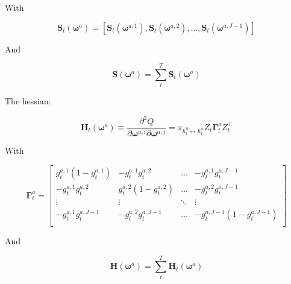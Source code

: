 \documentclass[12pt]{article}
\newcommand{\gateprod}[2]{\pi_{#1 \longleftrightarrow #2}}
\begin{document}
With

\begin{equation}
  \boldsymbol{S}_{t}(\boldsymbol{\omega}^{a}) = \left[\boldsymbol{S}_{t}(\boldsymbol{\omega}^{a, 1}),
                                                      \boldsymbol{S}_{t}(\boldsymbol{\omega}^{a, 2}),
                                                      \hdots, 
                                                      \boldsymbol{S}_{t}(\boldsymbol{\omega}^{a, J - 1})\right]
\end{equation}

And

\begin{equation}
  \boldsymbol{S}(\boldsymbol{\omega}^{a}) = \sum_{t}^{T} \boldsymbol{S}_{t}(\boldsymbol{\omega}^{a})
\end{equation}

\bigskip




The hessian:
\newcommand{\bw}[1]{\boldsymbol{\omega}^{#1}}
\newcommand{\Ht}[1]{\mathbf{H}_{t}(#1)}
\newcommand{\HH}[1]{\boldsymbol{H}(#1)}
\newcommand{\HI}[1]{\boldsymbol{H}^{-1}(#1)}

\begin{equation} \label{eq:nodehessian}
  \Ht{\bw{a}} \equiv \frac{\partial^{2} Q}{\partial \boldsymbol{\omega}^{a,i} \partial \boldsymbol{\omega}^{a,j}} = \gateprod{h^{0}_{t}}{h^{a}_{t}} Z_{t} \boldsymbol{\Gamma}^{a}_{t}  Z_{t}^\top
\end{equation}

With

\begin{equation}
  \boldsymbol{\Gamma}^{a}_{t} = \begin{bmatrix}
  g_{t}^{a,1}(1-g_{t}^{a,1}) & -g_{t}^{a,1}g_{t}^{a,2}    & \dots  & -g_{t}^{a,1}g_{t}^{a,J-1}       \\
  -g_{t}^{a,1}g_{t}^{a,2}    & g_{t}^{a,2}(1-g_{t}^{a,2}) & \dots  & -g_{t}^{a,2}g_{t}^{a,J-1}       \\
  \vdots                     &  \vdots                    & \ddots & \vdots                 \\
  -g_{t}^{a,1}g_{t}^{a,J-1}  & -g_{t}^{a,2}g_{t}^{a,J-1}  & \dots  & -g_{t}^{a,J-1}(1-g_{t}^{a,J-1}) \\
    \end{bmatrix}
\end{equation}

And

\begin{equation}
  \HH{\boldsymbol{\omega}^{a}} = \sum_{t}^{T} \Ht{\boldsymbol{\omega}^{a}}
\end{equation}
\end{document}
